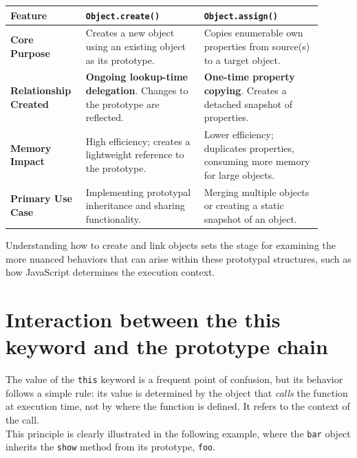 \documentclass{scrbook}
\begin{document}
\begin{center}
    \begin{tabular}{|p{0.2\linewidth}|p{0.35\linewidth}|p{0.35\linewidth}|}
    \hline
    
        Feature & \texttt{Object.create()} & \texttt{Object.assign()} \\ \hline
        
        \textbf{Core Purpose} & Creates a new object using an existing object as its prototype. & Copies enumerable own properties from source(s) to a target object. \\ \hline
        
        \textbf{Relationship Created} & \textbf{Ongoing lookup-time delegation}. Changes to the prototype are reflected. & \textbf{One-time property copying}. Creates a detached snapshot of properties. \\ \hline
        
        \textbf{Memory Impact} & High efficiency; creates a lightweight reference to the prototype. & Lower efficiency; duplicates properties, consuming more memory for large objects. \\ \hline
        
        \textbf{Primary Use Case} & Implementing prototypal inheritance and sharing functionality. & Merging multiple objects or creating a static snapshot of an object. \\ \hline
    \end{tabular}
\end{center}

Understanding how to create and link objects sets the stage for examining the more nuanced behaviors that can arise within these prototypal structures, such as how JavaScript determines the execution context.

\section{Interaction between the this keyword and the prototype chain}

The value of the \texttt{this} keyword is a frequent point of confusion, but its behavior follows a simple rule: its value is determined by the object that \textit{calls} the function at execution time, not by where the function is defined. It refers to the context of the call. \\

This principle is clearly illustrated in the following example, where the \texttt{bar} object inherits the \texttt{show} method from its prototype, \texttt{foo}.
\end{document}
